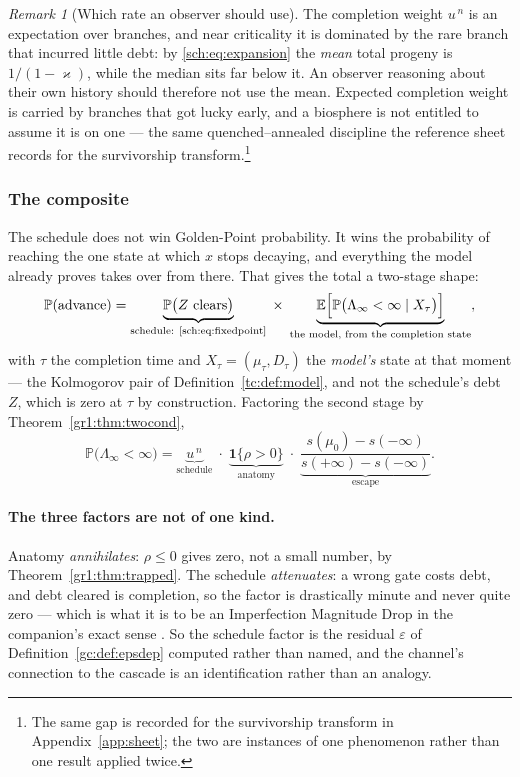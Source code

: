 \documentclass[11pt]{article}
\numberwithin{equation}{section}
\theoremstyle{plain}
\theoremstyle{definition}
\theoremstyle{remark}
\newtheorem{remark}[theorem]{Remark}
\newcommand{\E}{\mathbb{E}}
\newcommand{\PP}{\mathbb{P}}
\newcommand{\one}{\mathbf{1}}
\begin{document}
\begin{remark}[Which rate an observer should use]\label{sch:rem:gap2}
The completion weight $u^{\,n}$ is an expectation over branches, and
near criticality it is dominated by the rare branch that incurred little
debt: by \eqref{sch:eq:expansion} the \emph{mean} total progeny is
$1/(1-\varkappa)$, while the median sits far below it. An observer reasoning
about their own history should therefore not use the mean. Expected
completion weight is carried by branches that got lucky early, and a
biosphere is not entitled to assume it is on one --- the same
quenched--annealed discipline the reference sheet records for the
survivorship transform.\footnote{The same gap is recorded for the survivorship transform in Appendix~\ref{app:sheet}; the two are instances of one phenomenon rather than one result applied twice.}
\end{remark}

\subsubsection{The composite}\label{sch:subsub:composite}

The schedule does not win Golden-Point probability. It wins the
probability of reaching the one state at which $x$ stops decaying, and
everything the model already proves takes over from there. That gives
the total a two-stage shape:
\begin{equation}\label{sch:eq:composite}
\PP(\text{advance})
=\underbrace{\PP\bigl(Z\ \text{clears}\bigr)}_{\text{schedule:
\eqref{sch:eq:fixedpoint}}}
\;\times\;
\underbrace{\E\Bigl[\PP\bigl(\Lambda_\infty<\infty\mid X_{\tau}\bigr)
\Bigr]}_{\text{the model, from the completion state}},
\end{equation}
with $\tau$ the completion time and $X_\tau=(\mu_\tau,D_\tau)$ the
\emph{model's} state at that moment --- the Kolmogorov pair of
Definition~\ref{tc:def:model}, and not the schedule's debt $Z$, which is
zero at $\tau$ by construction. Factoring the second stage by
Theorem~\ref{gr1:thm:twocond},
\begin{equation}\label{sch:eq:threecond}
\PP\bigl(\Lambda_\infty<\infty\bigr)
=\underbrace{u^{\,n}}_{\text{schedule}}
\;\cdot\;\underbrace{\one\{\rho>0\}}_{\text{anatomy}}
\;\cdot\;\underbrace{\frac{s(\mu_0)-s(-\infty)}{s(+\infty)-s(-\infty)}}
_{\text{escape}} .
\end{equation}

\paragraph{The three factors are not of one kind.}\label{sch:rem:threefactor}
Anatomy \emph{annihilates}: $\rho\le0$ gives zero, not a small number,
by Theorem~\ref{gr1:thm:trapped}. The schedule \emph{attenuates}: a
wrong gate costs debt, and debt cleared is completion, so the factor is
drastically minute and never quite zero --- which is what it is to be an
Imperfection Magnitude Drop in the companion's exact sense \cite{Nexus}.
So the schedule factor is the residual $\varepsilon$ of
Definition~\ref{gc:def:epsdep} computed rather than named, and the
channel's connection to the cascade is an identification rather than an
analogy.
\end{document}

